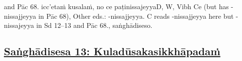 and Pāc 68. icc'etaṁ kusalaṁ, no ce paṭinissajeyya\makeatletter\hyperlink{endnote-appendix}\makeatother D, W, Vibh Ce (but has -nissajjeyya in Pāc 68), Other eds.: -nissajjeyya. C reads -nissajjeyya here but -nissajeyya in Sd 12–13
and Pāc 68., saṅghādiseso.



\subsection*{\hyperref[comm13]{Saṅghādisesa 13: Kuladūsakasikkhāpadaṁ}}
\label{sd13}

